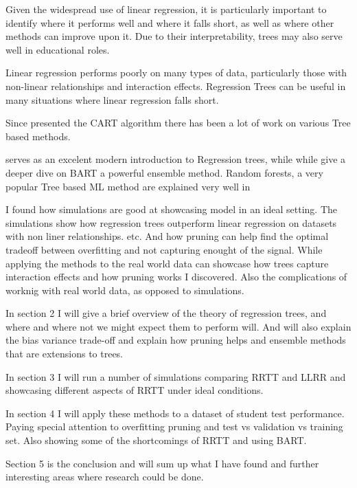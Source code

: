 \documentclass[12pt]{article}
\begin{document}
Given the widespread use of linear regression, it is particularly important to identify where it performs well and where it falls short, as well as where other methods can improve upon it. Due to their interpretability, trees may also serve well in educational roles.

Linear regression performs poorly on many types of data, particularly those with non-linear relationships and interaction effects. Regression Trees can be useful in many situations where linear regression falls short.

Since \citep{breiman1984} presented the CART algorithm there has been a lot of work on various Tree based methods.

\citep{hastie2021} serves as an excelent modern introduction to Regression trees, while while \citep{tan2019} give a deeper dive on BART a powerful ensemble method. 
Random forests, a very popular Tree based ML method are explained very well in\citep{biau2016}



I found how simulations are good at showcasing model in an ideal setting. The simulations show how regression trees outperform linear regression on datasets with non liner relationships. etc. And how pruning can help find the optimal tradeoff between overfitting and not capturing enought of the signal. While applying the methods to the real world data can showcase how trees capture  interaction effects and how pruning works I discovered. Also the complications of worknig with real world data, as opposed to simulations.

  
In section 2 I will give a brief overview of the theory of regression trees, and where and where not we might expect them to perform will. And will also explain the bias variance trade-off and explain how pruning helps and ensemble methods that are extensions to trees.

In section 3 I will run a number of simulations comparing RRTT and LLRR and showcasing different aspects of RRTT under ideal conditions.

In section 4 I will apply these methods to a dataset of student test performance. Paying special attention to overfitting pruning and test vs validation vs training set. Also showing some of the shortcomings of RRTT and using BART.

Section 5 is the conclusion and will sum up what I have found and further interesting areas where research could be done.
\end{document}
